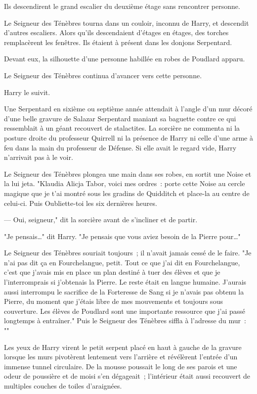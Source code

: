 Ils descendirent le grand escalier du deuxième étage sans rencontrer personne.

Le Seigneur des Ténèbres tourna dans un couloir, inconnu de Harry, et descendit d'autres escaliers. Alors qu'ils descendaient d'étages en étages, des torches remplacèrent les fenêtres. Ils étaient à présent dans les donjons Serpentard.

Devant eux, la silhouette d'une personne habillée en robes de Poudlard apparu.

Le Seigneur des Ténèbres continua d'avancer vers cette personne.

Harry le suivit.

Une Serpentard en sixième ou septième année attendait à l'angle d'un mur décoré d'une belle gravure de Salazar Serpentard maniant sa baguette contre ce qui ressemblait à un géant recouvert de stalactites. La sorcière ne commenta ni la posture droite du professeur Quirrell ni la présence de Harry ni celle d'une arme à feu dans la main du professeur de Défense. Si elle avait le regard vide, Harry n'arrivait pas à le voir.

Le Seigneur des Ténèbres plongea une main dans ses robes, en sortit une Noise et la lui jeta. "Klaudia Alicja Tabor, voici mes ordres~: porte cette Noise au cercle magique que je t'ai montré sous les gradins de Quidditch et place-la au centre de celui-ci. Puis Oubliette-toi les six dernières heures.

--- Oui, seigneur," dit la sorcière avant de s'incliner et de partir.

"Je pensais…" dit Harry. "Je pensais que vous aviez besoin de la Pierre pour…"

Le Seigneur des Ténèbres souriait toujours~; il n'avait jamais cessé de le faire. "Je n'ai pas dit ça en Fourchelangue, petit. Tout ce que j'ai dit en Fourchelangue, c'est que j'avais mis en place un plan destiné à tuer des élèves et que je l'interromprais si j'obtenais la Pierre. Le reste était en langue humaine. J'aurais aussi interrompu le sacrifice de la Forteresse de Sang si je n'avais pas obtenu la Pierre, du moment que j'étais libre de mes mouvements et toujours sous couverture. Les élèves de Poudlard sont une importante ressource que j'ai passé longtemps à entraîner." Puis le Seigneur des Ténèbres siffla à l'adresse du mur~: ""

Les yeux de Harry virent le petit serpent placé en haut à gauche de la gravure lorsque les murs pivotèrent lentement vers l'arrière et révélèrent l'entrée d'un immense tunnel circulaire. De la mousse poussait le long de ses parois et une odeur de poussière et de moisi s'en dégageait~; l'intérieur était aussi recouvert de multiples couches de toiles d'araignées.

